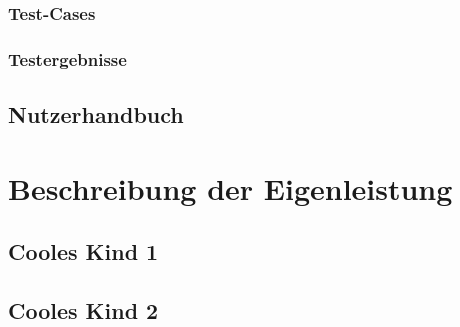 \documentclass[a4paper, 12pt, titlepage]{scrartcl}
\begin{document}
		\subsubsection{Test-Cases}
		\subsubsection{Testergebnisse}
	\subsection{Nutzerhandbuch} %
\section{Beschreibung der Eigenleistung} %
	\subsection{Cooles Kind 1}
	\subsection{Cooles Kind 2}
%
\end{document}
